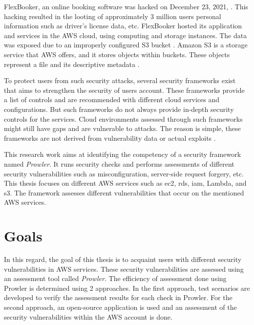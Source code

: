 \par FlexBooker, an online booking software was hacked on
December 23, 2021, \cite{6}\cite{7}.
This hacking resulted in the looting of approximately 3
million
users personal information such
as driver's license data, etc.
FlexBooker hosted its application and services in the AWS cloud, using computing and storage instances.
The data was exposed due to an improperly configured S3 bucket \cite{8}.
Amazon S3 is a storage service that AWS offers, and it
stores objects within buckets.
These objects represent a file and its descriptive metadata \cite{9}.




\par  To protect users from such security attacks, several security frameworks exist that aims to strengthen the
security of users account.
These frameworks provide a list of controls and are recommended with different cloud services and
configurations.
But such frameworks do not always provide in-depth security controls for the services.
Cloud
environments assessed through such frameworks might still have gaps and are vulnerable to attacks.
The reason is simple, these frameworks are not
derived from vulnerability data or actual exploits \cite{10}.

\par This research work aims at identifying the competency of a security framework named \textit{Prowler}.
It runs security checks and performs assessments of different security vulnerabilities such as misconfiguration,
server-side request forgery, etc.
This thesis focuses on different AWS services such as
\gls{ec2}, \gls{rds},
\gls{iam}, Lambda, and \gls{s3}.
The
framework assesses different vulnerabilities that occur on the mentioned AWS services.



\section{Goals}
\par In this regard, the goal of this thesis is to acquaint users with different security vulnerabilities in AWS
services.
These security vulnerabilities are assessed using an assessment tool called \textit{Prowler}. The
efficiency of assessment done using Prowler is determined using 2 approaches. In the first approach, test scenarios
are developed to verify the assessment results for each check in Prowler. For the second approach, an open-source
application is used and an assessment of the security vulnerabilities within the AWS account is done.

